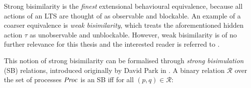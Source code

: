 \begin{isabellebody}
\begin{isamarkuptext}

Strong bisimilarity is the \emph{finest} extensional behavioural equivalence, because all actions of an LTS are thought of as observable and blockable. An example of a coarser equivalence is \emph{weak bisimilarity}, which treats the aforementioned hidden action $\tau$ as unobservable and unblockable. However, weak bisimilarity is of no further relevance for this thesis and the interested reader is referred to \cite[Chapter 3.4]{resyst}.

This notion of strong bisimilarity can be formalised through \emph{strong bisimulation} (SB) relations, introduced originally by David Park in \cite{park81}. A binary relation $\mathcal{R}$ over the set of processes $\mathit{Proc}$ is an SB iff for all $(p,q) \in \mathcal{R}$:


\end{isamarkuptext}
\end{isabellebody}
